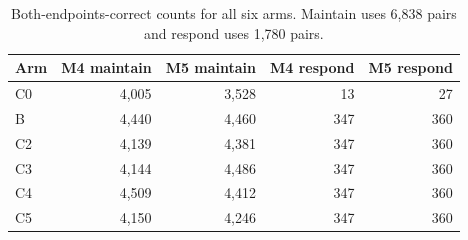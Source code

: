 \begin{table}[htbp]
\centering
\small
\caption{Both-endpoints-correct counts for all six arms. Maintain uses 6,838 pairs and respond uses 1,780 pairs.}
\label{tab:paired}
\setlength{\tabcolsep}{5pt}
\begin{tabular}{@{}lrrrr@{}}
\toprule
Arm & M4 maintain & M5 maintain & M4 respond & M5 respond \\
\midrule
C0 & 4,005 & 3,528 & 13 & 27 \\
B & 4,440 & 4,460 & 347 & 360 \\
C2 & 4,139 & 4,381 & 347 & 360 \\
C3 & 4,144 & 4,486 & 347 & 360 \\
C4 & 4,509 & 4,412 & 347 & 360 \\
C5 & 4,150 & 4,246 & 347 & 360 \\
\bottomrule
\end{tabular}
\end{table}
